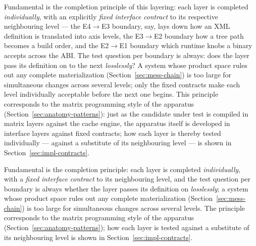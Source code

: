 \begin{nurlang}
Fundamental is the completion principle of this layering: each layer is completed \emph{individually},
with an explicitly \emph{fixed interface contract} to its respective neighbouring level
--- the E4$\to$E3 boundary, say, lays down how an XML definition is translated into axis levels, the
E3$\to$E2 boundary how a tree path becomes a build order, and the E2$\to$E1 boundary which
runtime knobs a binary accepts across the ABI\@. The test question per boundary is always:
does the layer pass its definition on to the next \emph{losslessly}? A system whose
product space rules out any complete materialization (Section~\ref{sec:mess-chain}) is
too large for simultaneous changes across several levels; only the fixed contracts make each level individually
acceptable before the next one begins.
This principle corresponds to the matrix programming style of the apparatus
(Section~\ref{sec:anatomy-patterns}): just as the candidate under test is compiled in matrix layers against the cache
engine, the apparatus itself is developed in interface layers against fixed contracts;
how each layer is thereby tested individually --- against a substitute of its neighbouring level --- is shown in
Section~\ref{sec:impl-contracts}.
\end{nurlang}
\begin{nurkurz}
Fundamental is the completion principle: each layer is completed \emph{individually}, with a \emph{fixed
interface contract} to its neighbouring level, and the test question per boundary is always whether the
layer passes its definition on \emph{losslessly}; a system whose product space rules out any complete
materialization (Section~\ref{sec:mess-chain}) is too large for simultaneous changes across several
levels. The principle corresponds to the matrix programming style of the apparatus
(Section~\ref{sec:anatomy-patterns}); how each layer is tested against a substitute of its neighbouring
level is shown in Section~\ref{sec:impl-contracts}.
\end{nurkurz}

